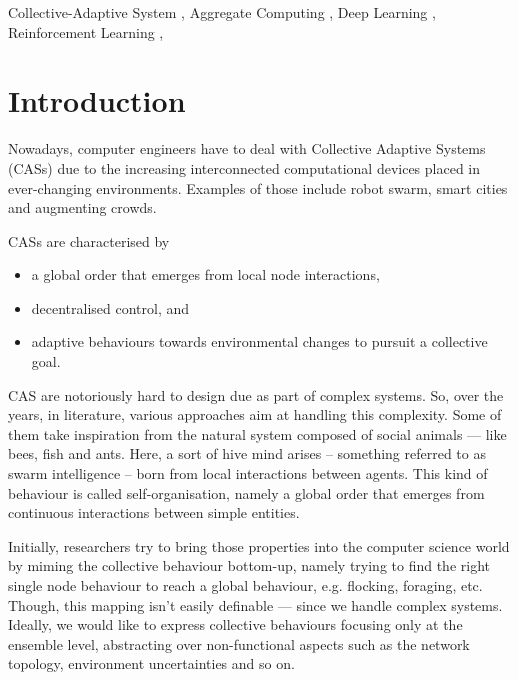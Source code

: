 \documentclass[
  twocolumn,
]{ceurart}
\begin{document}
\begin{keywords}
  Collective-Adaptive System \sep
  Aggregate Computing \sep
  Deep Learning \sep
  Reinforcement Learning \sep
\end{keywords}



\maketitle
{}
\section{Introduction}
Nowadays, computer engineers have to deal with Collective Adaptive Systems (CASs)
 due to the increasing interconnected computational devices placed in ever-changing environments.
 Examples of those include robot swarm, smart cities and augmenting crowds.

CASs are characterised by 
\begin{itemize}
\item a global order that emerges from local node interactions, 
\item  decentralised control, and 
\item adaptive behaviours towards environmental changes to pursuit a collective goal.
\end{itemize}
CAS are notoriously hard to design due as part of complex systems. 
%
So, over the years, in literature, various approaches aim at handling this complexity. 
%
Some of them take inspiration from the natural system
 composed of social animals --- like bees, fish and ants. 
%
Here, a sort of hive mind arises -- 
 something referred to as swarm intelligence -- 
born from local interactions between agents. 
%
This kind of behaviour is called self-organisation, 
 namely a global order that emerges from continuous 
 interactions between simple entities.

Initially, researchers try to bring those properties into  the computer science world 
 by miming the collective behaviour bottom-up, 
 namely trying to find the right single node behaviour 
 to reach a global behaviour, e.g. flocking, foraging, etc.
%
Though, this mapping isn't easily definable ---
 since we handle complex systems.
%
Ideally, we would like to express collective behaviours focusing only at the ensemble level,
 abstracting over non-functional aspects such as the network topology, environment uncertainties and 
 so on.
\end{document}
